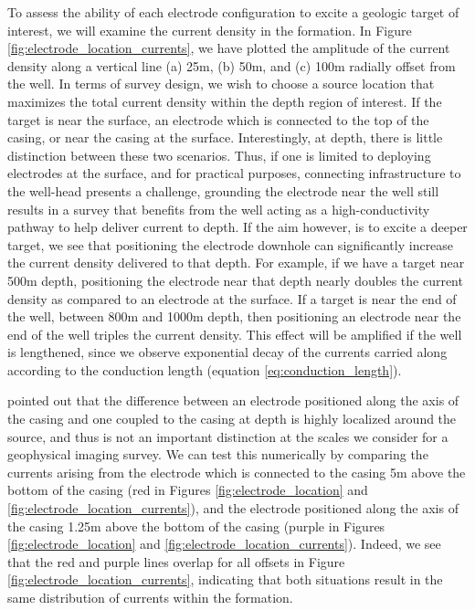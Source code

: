 

To assess the ability of each electrode configuration to excite a geologic target of interest, we will examine the current density in the formation. In Figure \ref{fig:electrode_location_currents}, we have plotted the amplitude of the current density along a vertical line (a) 25m, (b) 50m, and (c) 100m radially offset from the well. In terms of survey design, we wish to choose a source location that maximizes the total current density within the depth region of interest. If the target is near the surface, an electrode which is connected to the top of the casing, or near the casing at the surface. Interestingly, at depth, there is little distinction between these two scenarios. Thus, if one is limited to deploying electrodes at the surface, and for practical purposes, connecting infrastructure to the well-head presents a challenge, grounding the electrode near the well still results in a survey that benefits from the well acting as a high-conductivity pathway to help deliver current to depth. If the aim however, is to excite a deeper target, we see that positioning the electrode downhole can significantly increase the current density delivered to that depth. For example, if we have a target near 500m depth, positioning the electrode near that depth nearly doubles the current density as compared to an electrode at the surface. If a target is near the end of the well, between 800m and 1000m depth, then positioning an electrode near the end of the well triples the current density. This effect will be amplified if the well is lengthened, since we observe exponential decay of the currents carried along according to the conduction length (equation \ref{eq:conduction_length}).

\cite{Kaufman1990} pointed out that the difference between an electrode positioned along the axis of the casing and one coupled to the casing at depth is highly localized around the source, and thus is not an important distinction at the scales we consider for a geophysical imaging survey. We can test this numerically by comparing the currents arising from the electrode which is connected to the casing 5m above the bottom of the casing (red in Figures \ref{fig:electrode_location} and \ref{fig:electrode_location_currents}), and the electrode positioned along the axis of the casing 1.25m above the bottom of the casing (purple in Figures \ref{fig:electrode_location} and \ref{fig:electrode_location_currents}). Indeed, we see that the red and purple lines overlap for all offsets in Figure \ref{fig:electrode_location_currents}, indicating that both situations result in the same distribution of currents within the formation.

